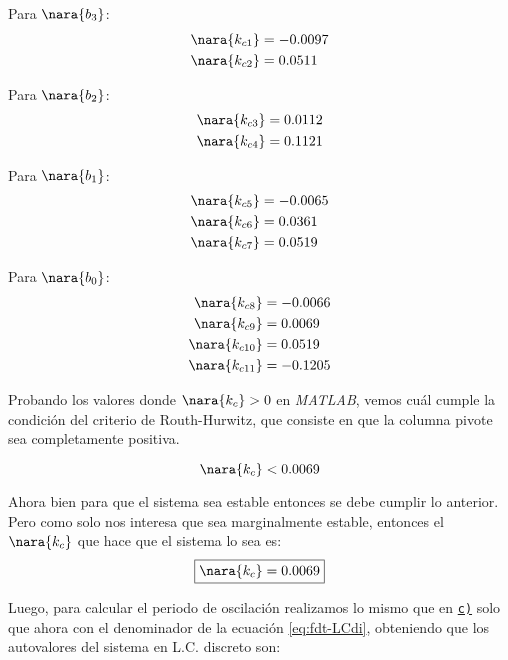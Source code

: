 \begin{multicols}{4}
    Para $\nara{b_3}$: 
    \begin{align}
        \nara{k_{c1}} & = -0.0097 \\
        \nara{k_{c2}} & = 0.0511
    \end{align}
    
    \columnbreak
    
    Para $\nara{b_2}$:
    \begin{align}
        \nara{k_{c3}} & = 0.0112 \\
        \nara{k_{c4}} & = 0.1121 \\
    \end{align}

    \columnbreak

    Para $\nara{b_1}$: 
    \begin{align}
        \nara{k_{c5}} & = -0.0065 \\
        \nara{k_{c6}} & = 0.0361 \\
        \nara{k_{c7}} & =   0.0519
    \end{align}
      
    \columnbreak

    Para $\nara{b_0}$: 
    \begin{align}
        \nara{k_{c8}} & = -0.0066 \\
        \nara{k_{c9}} & = 0.0069 \\
        \nara{k_{c10}} & = 0.0519 \\
        \nara{k_{c11}} & = -0.1205
    \end{align}

\end{multicols}

Probando los valores donde $\nara{k_{c}} > 0$ en \textit{MATLAB}, vemos cuál
cumple la condición del criterio de Routh-Hurwitz, que consiste en que la columna
pivote sea completamente positiva.

\begin{equation}
    \nara{k_{c}}  < 0.0069
\end{equation}

Ahora bien para que el sistema sea estable entonces se debe cumplir lo anterior. Pero 
como solo nos interesa que sea marginalmente estable, entonces el $\nara{k_{c}}$
que hace que el sistema lo sea es:
\begin{equation}
    \boxed{\nara{k_c} = 0.0069}
\end{equation}

Luego, para calcular el periodo de oscilación realizamos lo mismo que en
\hyperref[pregunta-c]{\texttt{c)}} solo que ahora con el denominador de la
ecuación \eqref{eq:fdt-LCdi}, obteniendo que los autovalores del sistema en L.C.
discreto son:

